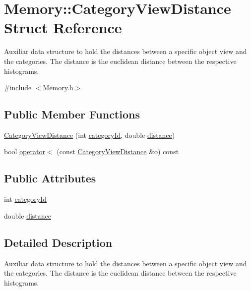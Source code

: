 \hypertarget{struct_memory_1_1_category_view_distance}{}\section{Memory\+:\+:Category\+View\+Distance Struct Reference}
\label{struct_memory_1_1_category_view_distance}


Auxiliar data structure to hold the distances between a specific object view and the categories. The distance is the euclidean distance between the respective histograms.  




{\ttfamily \#include $<$Memory.\+h$>$}

\subsection*{Public Member Functions}
\begin{DoxyCompactItemize}
\item 
\hyperlink{struct_memory_1_1_category_view_distance_a3e0c631eb136eb7a914d85f184cae552}{Category\+View\+Distance} (int \hyperlink{struct_memory_1_1_category_view_distance_aaa0114f6bc41b1df4cc5fb5f4eb11017}{category\+Id}, double \hyperlink{struct_memory_1_1_category_view_distance_aab4f1397e33f96a80d6e5e77cc66593c}{distance})
\item 
bool \hyperlink{struct_memory_1_1_category_view_distance_afa1664995bbdebd301f7f5ee33aa9c0e}{operator$<$} (const \hyperlink{struct_memory_1_1_category_view_distance}{Category\+View\+Distance} \&o) const
\end{DoxyCompactItemize}
\subsection*{Public Attributes}
\begin{DoxyCompactItemize}
\item 
int \hyperlink{struct_memory_1_1_category_view_distance_aaa0114f6bc41b1df4cc5fb5f4eb11017}{category\+Id}
\item 
double \hyperlink{struct_memory_1_1_category_view_distance_aab4f1397e33f96a80d6e5e77cc66593c}{distance}
\end{DoxyCompactItemize}


\subsection{Detailed Description}
Auxiliar data structure to hold the distances between a specific object view and the categories. The distance is the euclidean distance between the respective histograms. 

